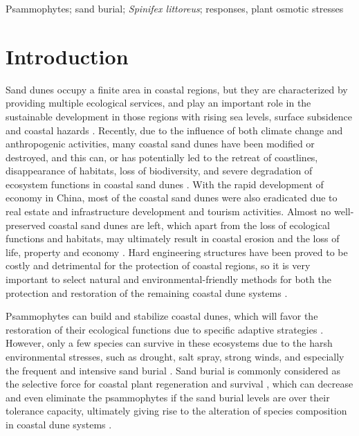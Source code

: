 \documentclass[]{interact}
\theoremstyle{plain}%
\theoremstyle{definition}
\theoremstyle{remark}
\begin{document}
\begin{keywords}
Psammophytes; sand burial; \textit{\textit{Spinifex littoreus}}; responses, plant osmotic stresses
\end{keywords}


\section{Introduction}

\label{Introduction-1}
Sand dunes occupy a finite area in coastal regions, but they are characterized by providing multiple ecological services, and play an important role in the sustainable development in those regions with rising sea levels, surface subsidence and coastal hazards 
\citep{martinezFragilityConservationWorld2004,debattistiBelowgroundBiomassPlants2020}. 
Recently, due to the influence of both climate change and anthropogenic activities, many coastal sand dunes have been modified or destroyed, and this can, or has potentially led to the retreat of coastlines, disappearance of habitats, loss of biodiversity, and severe degradation of ecosystem functions in coastal sand dunes 
\citep{feaginCoastalErosionGlobal2005,schlacherVegetationGhostCrabs2011,quEffectsSandBurial2017}. 
With the rapid development of economy in China, most of the coastal sand dunes were also eradicated due to real estate and infrastructure development and tourism activities. Almost no well-preserved coastal sand dunes are left, which apart from the loss of ecological functions and habitats, may ultimately result in coastal erosion and the loss of life, property and economy 
\citep{xian-jiDiurnalVariationCharacteristics2017}. 
Hard engineering structures have been proved to be costly and detrimental for the protection of coastal regions, so it is very important to select natural and environmental-friendly methods for both the protection and restoration of the remaining coastal dune systems 
\citep{hanleyShiftingSandsCoastal2014}.

\label{Introduction-2}
Psammophytes can build and stabilize coastal dunes, which will favor the restoration of their ecological functions due to specific adaptive strategies 
\citep{yuanEffectsSandAccretion1993,brownMechanismsSurvivingBurial2018,debattistiBelowgroundBiomassPlants2020}. 
However, only a few species can survive in these ecosystems due to the harsh environmental stresses, such as drought, salt spray, strong winds, and especially the frequent and intensive sand burial 
\citep{maunEffectsBurialSand1986,hespEcologicalProcessesPlant1991,maunAdaptationsEnhancingSurvival1994,y.-y.zhaoAdvanceDistributionAdaptability2014,duSaltSprayDistribution2020}. 
Sand burial is commonly considered as the selective force for coastal plant regeneration and survival \citep{moreno-casasolaSandMovementFactor1986, maunAdaptationsEnhancingSurvival1994}, which can decrease and even eliminate the psammophytes if the sand burial levels are over their tolerance capacity, ultimately giving rise to the alteration of species composition in coastal dune systems \citep{maunZonationVegetationLacustrine1999,millerEffectsDisturbanceVegetation2015}. 
\end{document}
